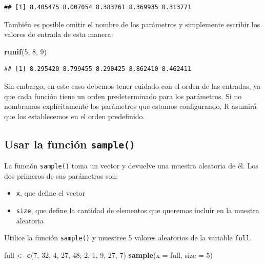 \documentclass[
]{book}
\newenvironment{Shaded}{\begin{snugshade}}{\end{snugshade}}
\newcommand{\DataTypeTok}[1]{\textcolor[rgb]{0.13,0.29,0.53}{#1}}
\newcommand{\DecValTok}[1]{\textcolor[rgb]{0.00,0.00,0.81}{#1}}
\newcommand{\KeywordTok}[1]{\textcolor[rgb]{0.13,0.29,0.53}{\textbf{#1}}}
\newcommand{\NormalTok}[1]{#1}
\newcommand{\StringTok}[1]{\textcolor[rgb]{0.31,0.60,0.02}{#1}}
\providecommand{\tightlist}{%
  \setlength{\itemsep}{0pt}\setlength{\parskip}{0pt}}
\begin{document}
\begin{verbatim}
## [1] 8.405475 8.007054 8.383261 8.369935 8.313771
\end{verbatim}

También es posible omitir el nombre de los parámetros y simplemente escribir los valores de entrada de esta manera:

\begin{Shaded}
\begin{Highlighting}[]
\KeywordTok{runif}\NormalTok{(}\DecValTok{5}\NormalTok{, }\DecValTok{8}\NormalTok{, }\DecValTok{9}\NormalTok{)}
\end{Highlighting}
\end{Shaded}

\begin{verbatim}
## [1] 8.295420 8.799455 8.290425 8.862410 8.462411
\end{verbatim}

Sin embargo, en este caso debemos tener cuidado con el orden de las entradas, ya que cada función tiene un orden predeterminado para los parámetros. Si no nombramos explícitamente los parámetros que estamos configurando, R asumirá que los establecemos en el orden predefinido.

\hypertarget{usar-la-funciuxf3n-sample}{%
\subsection{\texorpdfstring{Usar la función \texttt{sample()}}{Usar la función sample()}}\label{usar-la-funciuxf3n-sample}}

La función \texttt{sample()} toma un vector y devuelve una muestra aleatoria de él. Los dos primeros de sus parámetros son:

\begin{itemize}
\tightlist
\item
  \texttt{x}, que define el vector
\item
  \texttt{size}, que define la cantidad de elementos que queremos incluir en la muestra aleatoria
\end{itemize}

Utilice la función \texttt{sample()} y muestree 5 valores aleatorios de la variable \texttt{full}.

\begin{Shaded}
\begin{Highlighting}[]
\NormalTok{full <-}\StringTok{ }\KeywordTok{c}\NormalTok{(}\DecValTok{7}\NormalTok{, }\DecValTok{32}\NormalTok{, }\DecValTok{4}\NormalTok{, }\DecValTok{27}\NormalTok{, }\DecValTok{48}\NormalTok{, }\DecValTok{2}\NormalTok{, }\DecValTok{1}\NormalTok{, }\DecValTok{9}\NormalTok{, }\DecValTok{27}\NormalTok{, }\DecValTok{7}\NormalTok{)}
\KeywordTok{sample}\NormalTok{(}\DataTypeTok{x =}\NormalTok{ full, }\DataTypeTok{size =} \DecValTok{5}\NormalTok{)}
\end{Highlighting}
\end{Shaded}
\end{document}
